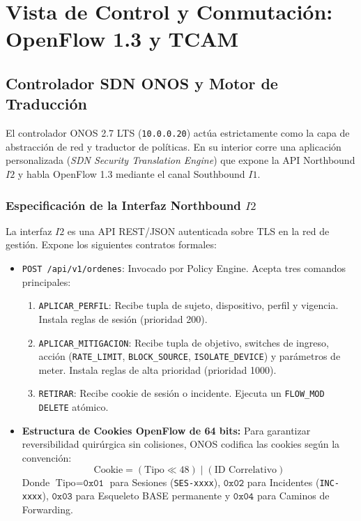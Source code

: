 \documentclass[11pt,a4paper]{report}
\begin{document}
\chapter{Vista de Control y Conmutación: OpenFlow 1.3 y TCAM}

\section{Controlador SDN ONOS y Motor de Traducción}
El controlador ONOS 2.7 LTS (\texttt{10.0.0.20}) actúa estrictamente como la capa de abstracción de red y traductor de políticas. En su interior corre una aplicación personalizada (\emph{SDN Security Translation Engine}) que expone la API Northbound $I2$ y habla OpenFlow 1.3 mediante el canal Southbound $I1$.

\subsection{Especificación de la Interfaz Northbound $I2$}
La interfaz $I2$ es una API REST/JSON autenticada sobre TLS en la red de gestión. Expone los siguientes contratos formales:
\begin{itemize}[leftmargin=*]
    \item \texttt{POST /api/v1/ordenes}: Invocado por Policy Engine. Acepta tres comandos principales:
    \begin{enumerate}
        \item \texttt{APLICAR\_PERFIL}: Recibe tupla de sujeto, dispositivo, perfil y vigencia. Instala reglas de sesión (prioridad 200).
        \item \texttt{APLICAR\_MITIGACION}: Recibe tupla de objetivo, switches de ingreso, acción (\texttt{RATE\_LIMIT}, \texttt{BLOCK\_SOURCE}, \texttt{ISOLATE\_DEVICE}) y parámetros de meter. Instala reglas de alta prioridad (prioridad 1000).
        \item \texttt{RETIRAR}: Recibe cookie de sesión o incidente. Ejecuta un \texttt{FLOW\_MOD DELETE} atómico.
    \end{enumerate}
    \item \textbf{Estructura de Cookies OpenFlow de 64 bits:} Para garantizar reversibilidad quirúrgica sin colisiones, ONOS codifica las cookies según la convención:
    \begin{equation}
    \text{Cookie} = (\text{Tipo} \ll 48) \mid (\text{ID Correlativo})
    \end{equation}
    Donde $\text{Tipo} = \texttt{0x01}$ para Sesiones (\texttt{SES-xxxx}), $\texttt{0x02}$ para Incidentes (\texttt{INC-xxxx}), $\texttt{0x03}$ para Esqueleto BASE permanente y $\texttt{0x04}$ para Caminos de Forwarding.
\end{itemize}
\end{document}
